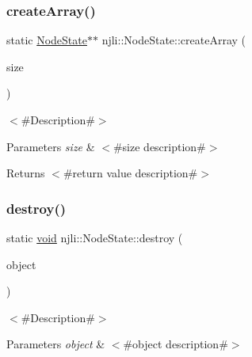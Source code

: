 \subsubsection{\texorpdfstring{create\+Array()}{createArray()}}
{\footnotesize\ttfamily static \mbox{\hyperlink{classnjli_1_1_node_state}{Node\+State}}$\ast$$\ast$ njli\+::\+Node\+State\+::create\+Array (\begin{DoxyParamCaption}\item[{const \mbox{\hyperlink{_util_8h_a10e94b422ef0c20dcdec20d31a1f5049}{u32}}}]{size }\end{DoxyParamCaption})\hspace{0.3cm}{\ttfamily [static]}}

$<$\#\+Description\#$>$


\begin{DoxyParams}{Parameters}
{\em size} & $<$\#size description\#$>$\\
\hline
\end{DoxyParams}
\begin{DoxyReturn}{Returns}
$<$\#return value description\#$>$ 
\end{DoxyReturn}
\mbox{\label{classnjli_1_1_node_state_a0de1bbd47e3cdbb87fcb81ecae81c2c7}} 
\subsubsection{\texorpdfstring{destroy()}{destroy()}}
{\footnotesize\ttfamily static \mbox{\hyperlink{_thread_8h_af1e856da2e658414cb2456cb6f7ebc66}{void}} njli\+::\+Node\+State\+::destroy (\begin{DoxyParamCaption}\item[{\mbox{\hyperlink{classnjli_1_1_node_state}{Node\+State}} $\ast$}]{object }\end{DoxyParamCaption})\hspace{0.3cm}{\ttfamily [static]}}

$<$\#\+Description\#$>$


\begin{DoxyParams}{Parameters}
{\em object} & $<$\#object description\#$>$ \\
\hline
\end{DoxyParams}
\mbox{\label{classnjli_1_1_node_state_a6f2ce1a2b1a3ad475cd4b8b23321533e}} 
